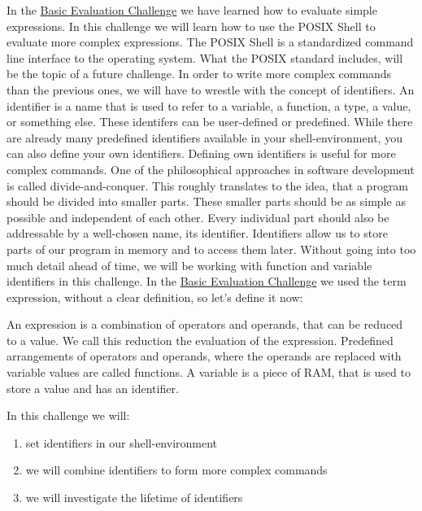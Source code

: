 \begin{challenge}
    \begin{chadescription}
        In the \href{https://github.com/STEMgraph/ac584d6d-1397-49d9-8319-85e9fbd4b765}{Basic Evaluation Challenge} we have learned how to evaluate simple expressions.
        In this challenge we will learn how to use the POSIX Shell to evaluate more complex expressions.
        The POSIX Shell is a standardized command line interface to the operating system.
        What the POSIX standard includes, will be the topic of a future challenge.
        In order to write more complex commands than the previous ones, we will have to wrestle with the concept of identifiers. 
        An identifier is a name that is used to refer to a variable, a function, a type, a value, or something else.
        These identifers can be user-defined or predefined.
        While there are already many predefined identifiers available in your shell-environment, you can also define your own identifiers.
        Defining own identifiers is useful for more complex commands.
        One of the philosophical approaches in software development is called divide-and-conquer.
        This roughly translates to the idea, that a program should be divided into smaller parts.
        These smaller parts should be as simple as possible and independent of each other.
        Every individual part should also be addressable by a well-chosen name, its identifier.
        Identifiers allow us to store parts of our program in memory and to access them later.
        Without going into too much detail ahead of time, we will be working with function and variable identifiers in this challenge.
        In the \href{https://github.com/STEMgraph/ac584d6d-1397-49d9-8319-85e9fbd4b765}{Basic Evaluation Challenge} we used the term expression, without a clear definition, so let's define it now:
        \begin{definition}
            An expression is a combination of operators and operands, that can be reduced to a value. 
            We call this reduction the evaluation of the expression.
            Predefined arrangements of operators and operands, where the operands are replaced with variable values are called functions.
            A variable is a piece of RAM, that is used to store a value and has an identifier.
        \end{definition}

        In this challenge we will: 
        \begin{enumerate}
            \item set identifiers in our shell-environment
            \item we will combine identifiers to form more complex commands
            \item we will investigate the lifetime of identifiers
        \end{enumerate}
    \end{chadescription}


\end{challenge}
